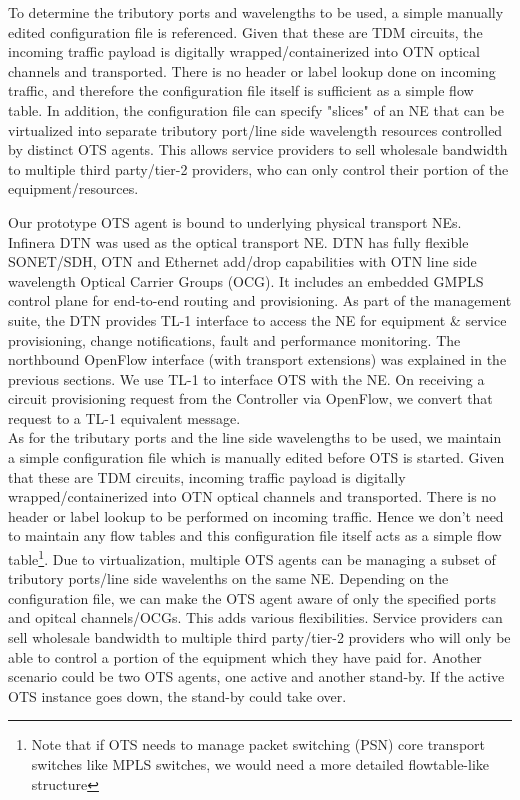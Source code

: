\documentclass{sig-alternate-10pt}
\begin{document}
	To determine the tributory ports and wavelengths to be used, a simple manually edited configuration file is referenced.  Given that
	these are TDM circuits, the incoming traffic payload is digitally wrapped/containerized into OTN optical channels and transported.  
	There is no header or label lookup done on incoming traffic, and therefore the configuration  file itself is sufficient as a simple flow table. 
	In addition, the configuration file can specify "slices" of an NE that can be virtualized into separate tributory port/line side wavelength 
	resources controlled by distinct OTS agents.  This allows service providers to sell wholesale bandwidth to multiple third party/tier-2 providers,
	who can only control their portion of the equipment/resources.

\iffalse
	Our prototype OTS agent is bound to underlying physical transport NEs. Infinera DTN \cite{dtn} was used
	as the optical transport NE. DTN has fully flexible SONET/SDH, OTN and Ethernet add/drop
	capabilities with OTN \cite{otn} line side wavelength Optical Carrier Groups (OCG). It includes an
	embedded GMPLS control plane for end-to-end routing and provisioning. As part of the management suite,
	the DTN provides TL-1 interface to access the NE for equipment \& service provisioning, change
	notifications, fault and performance monitoring. The northbound OpenFlow interface (with
	transport extensions) was explained in the previous sections. We use TL-1 to interface OTS with the NE.
	On receiving a circuit provisioning request from the Controller via OpenFlow, we convert
	that request to a TL-1 equivalent message. \\

	As for the tributary ports and the line side wavelengths to be used, we maintain a simple configuration file which
	is manually edited before OTS is started. Given that these are TDM circuits, incoming traffic payload is
	digitally wrapped/containerized into OTN optical channels and transported. There is no header or label
	lookup to be performed on incoming traffic. Hence we don't need to maintain any flow tables and this
	configuration file itself acts as a simple flow table\footnote{Note that if OTS needs to manage packet
	switching (PSN) core transport switches like MPLS switches, we would need a more detailed flowtable-like
	structure}. Due to virtualization, multiple OTS agents can be managing a subset of tributory ports/line
	side wavelenths on the same NE. Depending on the configuration file, we can make the OTS agent aware of
	only the specified ports and opitcal channels/OCGs. This adds various flexibilities. Service providers
	can sell wholesale bandwidth to multiple third party/tier-2 providers who will only be able to control a
	portion of the equipment which they have paid for. Another scenario could be two OTS agents, one active
	and another stand-by. If the active OTS instance goes down, the stand-by could take over.\\
\end{document}
